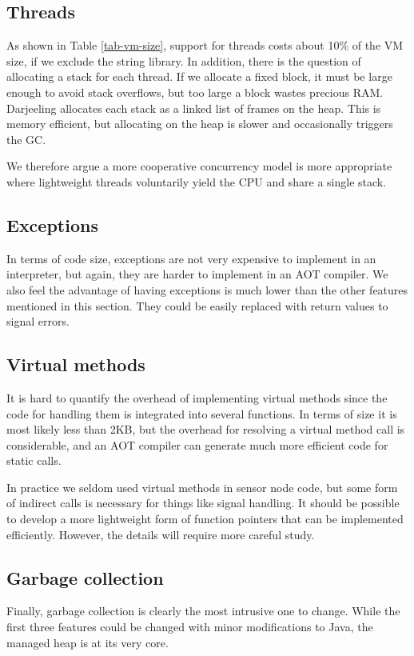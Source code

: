 \subsection{Threads}
As shown in Table \ref{tab-vm-size}, support for threads costs about 10\% of the VM size, if we exclude the string library. In addition, there is the question of allocating a stack for each thread. If we allocate a fixed block, it must be large enough to avoid stack overflows, but too large a block wastes precious RAM. Darjeeling allocates each stack as a linked list of frames on the heap. This is memory efficient, but allocating on the heap is slower and occasionally triggers the GC.

We therefore argue a more cooperative concurrency model is more appropriate where lightweight threads voluntarily yield the CPU and share a single stack.

\subsection{Exceptions}
In terms of code size, exceptions are not very expensive to implement in an interpreter, but again, they are harder to implement in an AOT compiler. We also feel the advantage of having exceptions is much lower than the other features mentioned in this section. They could be easily replaced with return values to signal errors.

\subsection{Virtual methods}
It is hard to quantify the overhead of implementing virtual methods since the code for handling them is integrated into several functions. In terms of size it is most likely less than 2KB, but the overhead for resolving a virtual method call is considerable, and an AOT compiler can generate much more efficient code for static calls.

In practice we seldom used virtual methods in sensor node code, but some form of indirect calls is necessary for things like signal handling. It should be possible to develop a more lightweight form of function pointers that can be implemented efficiently. However, the details will require more careful study.

\subsection{Garbage collection}
Finally, garbage collection is clearly the most intrusive one to change. While the first three features could be changed with minor modifications to Java, the managed heap is at its very core.

